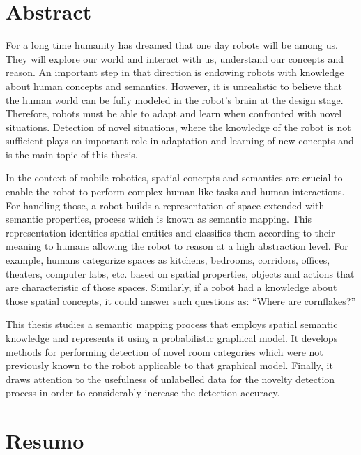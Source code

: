 \chapter*{Abstract}

For a long time humanity has dreamed that one day robots will be among us. They will explore our world
and interact with us, understand our concepts and reason. An important step in that direction is endowing 
robots with knowledge about human concepts and semantics. However, it is unrealistic to believe that the 
human world can be fully modeled in the robot's brain at the design stage. Therefore, robots must be able 
to adapt and learn when confronted with novel situations. Detection of novel situations, where the knowledge
of the robot is not sufficient plays an important role in adaptation and learning of new concepts and 
is the main topic of this thesis.

In the context of mobile robotics, spatial concepts and semantics are crucial to enable the robot to perform
complex human-like tasks and human interactions. For handling those, a robot builds a representation
of space extended with semantic properties, process which is known as semantic mapping.
This representation identifies spatial entities and classifies them according to their meaning to
humans allowing the robot to reason at a high abstraction level. For example, humans categorize spaces as 
kitchens, bedrooms, corridors, offices, theaters, computer labs, etc. based on spatial properties, 
objects and actions that are characteristic of those spaces. Similarly, if a robot had a knowledge about
those spatial concepts, it could answer such questions as: ``Where are cornflakes?''

This thesis studies a semantic mapping process that employs spatial semantic knowledge
and represents it using a probabilistic graphical model. It develops methods 
for performing detection of novel room categories which were not previously known to the robot applicable 
to that graphical model. Finally, it draws attention to the usefulness of unlabelled data for the 
novelty detection process in order to considerably increase the detection accuracy.


\chapter*{Resumo}

